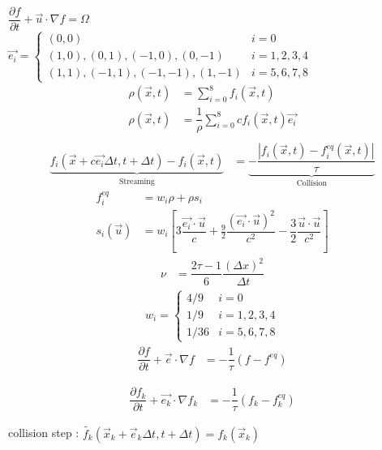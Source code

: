 \documentclass[12pt,a4paper]{report}
\begin{document}
	$
	\dfrac{\partial f}{\partial t} +\vec{u}\cdot \nabla f = \Omega
	$\\
	
	$
	\vec{e_{i}} = 
	\begin{cases}
		(0,0) & i = 0\\
		(1,0),(0,1),(-1,0),(0,-1) & i = 1,2,3,4\\
		(1,1),(-1,1),(-1,-1),(1,-1) & i = 5,6,7,8
	\end{cases}
	$
	\begin{align}
		\rho(\vec{x},t) &= \sum_{i=0}^{8} f_{i}(\vec{x},t)\\
		\rho(\vec{x},t) &= \dfrac{1}{\rho}\sum_{i=0}^{8} cf_{i}(\vec{x},t)\vec{e_i}\\		
	\end{align}
	\begin{align}
		\underbrace{f_i\left(\vec{x} + c\vec{e_i}\Delta t, t+\Delta t\right) - f_i\left(\vec{x}, t\right)}_{\text{Streaming}} &= \underbrace{ -\dfrac{|f_i\left(\vec{x},t\right) - f^{eq}_i\left(\vec{x},t\right)|}{\tau}}_{\text{Collision}}
	\end{align}
	\begin{align}
		f^{eq}_i &= w_i\rho + \rho s_i\\
		s_i(\vec{u}) &= w_i\left[3\dfrac{\vec{e_i}\cdot \vec{u}}{c} + \frac{9}{2}\dfrac{(\vec{e_i}\cdot \vec{u})^2}{c^2} - \dfrac{3}{2}\dfrac{\vec{u}\cdot\vec{u}}{c^2}\right] 
	\end{align}
	\begin{align}
		\nu &= \dfrac{2\tau - 1}{6}\dfrac{(\Delta x)^2}{\Delta t} 
	\end{align}
	\begin{align}
		w_i = 
		\begin{cases}
			4/9  & i = 0\\
			1/9  & i = 1,2,3,4\\
			1/36 & i = 5,6,7,8
		\end{cases}
	\end{align}
	\begin{align}
		\dfrac{\partial f}{\partial t} + \vec{e}\cdot\nabla f &= -\dfrac{1}{\tau}\left(f - f^{eq}\right)
	\end{align}

	\begin{align}
		\dfrac{\partial f_k}{\partial t} + \vec{e_k}\cdot\nabla f_k &= -\dfrac{1}{\tau}\left(f_k - f^{eq}_k\right)
	\end{align}
	
	collision step : $\tilde{f_k}\left(\vec{x}_k + \vec{e}_k\Delta t, t+ \Delta t\right) = f_k(\vec{x}_k)$
	
\end{document}

